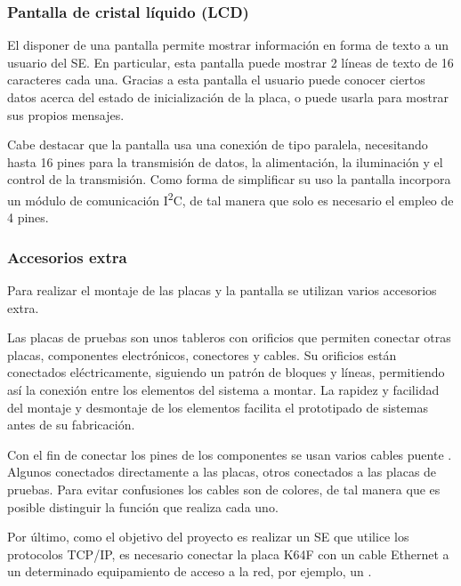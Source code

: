 \subsubsection{Pantalla de cristal líquido (LCD)}{\label{sec:lcd}}
El disponer de una pantalla permite mostrar información en forma de texto a un
usuario del SE. En particular, esta pantalla puede mostrar 2 líneas de texto
de 16 caracteres cada una. Gracias a esta pantalla el usuario puede
conocer ciertos datos acerca del estado de inicialización de la placa, o puede
usarla para mostrar sus propios mensajes.

Cabe destacar que la pantalla usa una conexión de tipo paralela, necesitando
hasta 16 pines para la transmisión de datos, la alimentación, la iluminación y
el control de la transmisión. Como forma de simplificar su uso la pantalla
incorpora un módulo de comunicación I\textsuperscript{2}C, de tal manera que
solo es necesario el empleo de 4 pines.

\subsubsection{Accesorios extra}{\label{sec:extras}}
Para realizar el montaje de las placas y la pantalla se utilizan varios
accesorios extra.

Las placas de pruebas \cite{webpage:placa-pruebas} son unos tableros con
orificios que permiten conectar otras placas, componentes electrónicos,
conectores y cables. Su orificios están conectados eléctricamente, siguiendo un
patrón de bloques y líneas, permitiendo así la conexión entre los elementos del
sistema a montar. La rapidez y facilidad del montaje y desmontaje de los
elementos facilita el prototipado de sistemas antes de su fabricación.

Con el fin de conectar los pines de los componentes se usan varios cables
puente \cite{webpage:cable-puente}. Algunos conectados directamente a las
placas, otros conectados a las placas de pruebas. Para evitar confusiones los
cables son de colores, de tal manera que es posible distinguir la función que
realiza cada uno.

Por último, como el objetivo del proyecto es realizar un SE que utilice los
protocolos TCP/IP, es necesario conectar la placa K64F con un cable Ethernet
a un determinado equipamiento de acceso a la red, por ejemplo,
un .
